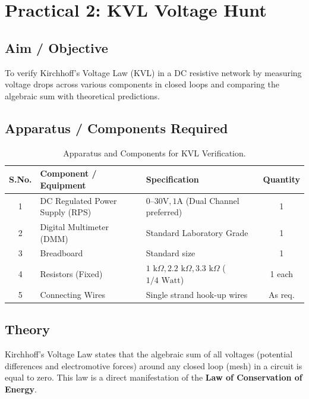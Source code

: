 \chapter{Practical 2: KVL Voltage Hunt}

\section{Aim / Objective}
To verify Kirchhoff's Voltage Law (KVL) in a DC resistive network by measuring voltage drops across various components in closed loops and comparing the algebraic sum with theoretical predictions.

\section{Apparatus / Components Required}

\begin{table}[htbp]
\centering
\small
\begin{tabularx}{\textwidth}{c l X c}
\toprule
\textbf{S.No.} & \textbf{Component / Equipment} & \textbf{Specification} & \textbf{Quantity} \\
\midrule
1 & DC Regulated Power Supply (RPS) & $0\text{--}30\text{V}, 1\text{A}$ (Dual Channel preferred) & 1 \\
2 & Digital Multimeter (DMM) & Standard Laboratory Grade & 1 \\
3 & Breadboard & Standard size & 1 \\
4 & Resistors (Fixed) & $1\text{ k}\Omega, 2.2\text{ k}\Omega, 3.3\text{ k}\Omega$ ($1/4\text{ Watt}$) & 1 each \\
5 & Connecting Wires & Single strand hook-up wires & As req. \\
\bottomrule
\end{tabularx}
\caption{Apparatus and Components for KVL Verification.}
\label{tab:kvl-apparatus}
\end{table}

\section{Theory}

\begin{definition}
Kirchhoff's Voltage Law states that the algebraic sum of all voltages (potential differences and electromotive forces) around any closed loop (mesh) in a circuit is equal to zero. This law is a direct manifestation of the \textbf{Law of Conservation of Energy}.
\end{definition}

